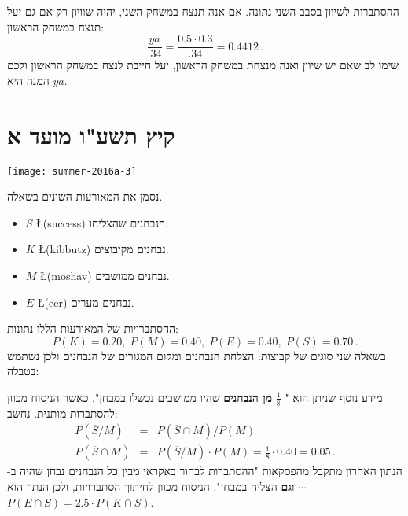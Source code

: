 ההסתברות לשיוון בסבב השני נתונה. אם אנה תנצח במשחק השני, יהיה שוויון רק אם גם יעל תנצח במשחק הראשון:
\[
\frac{ya}{.34}=\frac{0.5\cdot 0.3}{.34}=0.4412\,.
\]
שימו לב שאם יש שיוון ואנה מנצחת במשחק הראשון, יעל חייבת לנצח במשחק הראשון ולכם המנה היא 
$ya$.


\newpage

\section{קיץ תשע"ו מועד א}

\begin{center}
\texttt{[image: summer-2016a-3]}
\end{center}

נסמן את המאורעות השונים בשאלה.
\begin{itemize}
\item $S$ \L{(success)}
הנבחנים שהצליחו.
\item $K$ \L{(kibbutz)} 
נבחנים מקיבוצים.
\item $M$ \L{(moshav)}
נבחנים ממושבים.
\item $E$ \L{(eer)}
נבחנים מערים.
\end{itemize}
ההסתברויות של המאורעות הללו נתונות:
\[
P(K)=0.20,\;P(M)=0.40,\;P(E)=0.40,\;P(S)=0.70\,.
\]
בשאלה שני סוגים של קבוצות: הצלחת הנבחנים ומקום המגורים של הנבחנים ולכן נשתמש בטבלה:
\begin{center}
\end{center}
מידע נוסף שניתן הוא "%
$\frac{1}{8}$
\textbf{מן הנבחנים}
שהיו ממושבים נכשלו במבחן", כאשר הניסוח מכוון להסתברות מותנית. נחשב:
\begin{eqnarray*}
P(\overline{S}/M)&=&P(\overline{S}\cap M) / P(M)\\
P(\overline{S}\cap M)&=&P(\overline{S}/M)\cdot P(M)=\frac{1}{8}\cdot 0.40=0.05\,.
\end{eqnarray*}
הנתון האחרון מתקבל מהפסקאות "ההסתברות לבחור באקראי
\textbf{מבין כל}
הנבחנים נבחן שהיה ב-%
$\cdots$
\textbf{וגם}
הצליח במבחן". הניסוח מכוון לחיתוך הסתברויות, ולכן הנתון הוא
$P(E\cap S)=2.5\cdot P(K\cap S)$.

